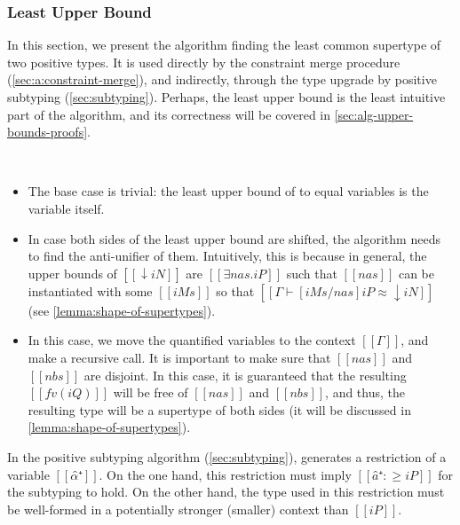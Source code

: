 \subsubsection{Least Upper Bound}
\label{sec:a:lub}

In this section, we present
the algorithm finding the least common supertype of two positive types. 
It is used directly by the constraint merge procedure (\cref{sec:a:constraint-merge}),
and indirectly, through the type upgrade by positive subtyping
(\cref{sec:subtyping}). Perhaps, the least upper bound is the least 
intuitive part of the algorithm, and its correctness will be covered
in \cref{sec:alg-upper-bounds-proofs}.

\begin{algorithm}
  \hfill\\
  \ottdefnLUBNsubLabeled[\apppref]{}
\end{algorithm}

\begin{itemize}
  \item {}
    The base case is trivial: 
    the least upper bound of to equal variables
    is the variable itself.
  \item {}
    In case both sides of the least upper bound are shifted,
    the algorithm needs to find the anti-unifier of them. 
    Intuitively, this is because in general, the upper bounds of
    $[[↓iN]]$ are $[[∃nas.iP]]$ such that 
    $[[nas]]$ can be instantiated with some $[[iMs]]$ so that
    $[[ Γ ⊢ [iMs/nas]iP ≈ ↓iN ]]$ (see \cref{lemma:shape-of-supertypes}).
  \item {}
    In this case, we move the quantified variables to the context $[[Γ]]$, 
    and make a recursive call. 
    It is important to make sure that $[[nas]]$ and $[[nbs]]$ are disjoint.
    In this case, it is guaranteed that the resulting 
    $[[fv(iQ)]]$ will be free of $[[nas]]$ and $[[nbs]]$,
    and thus, the resulting type will be a supertype of both sides
    (it will be discussed in \cref{lemma:shape-of-supertypes}).
\end{itemize}


In the positive subtyping algorithm (\cref{sec:subtyping}),
generates a restriction of a variable $[[α̂⁺]]$.
On the one hand, this restriction must imply 
$[[â⁺ :≥ iP]]$ for the subtyping to hold.
On the other hand, the type used in this restriction 
must be well-formed in a potentially stronger (smaller) 
context than $[[iP]]$.

